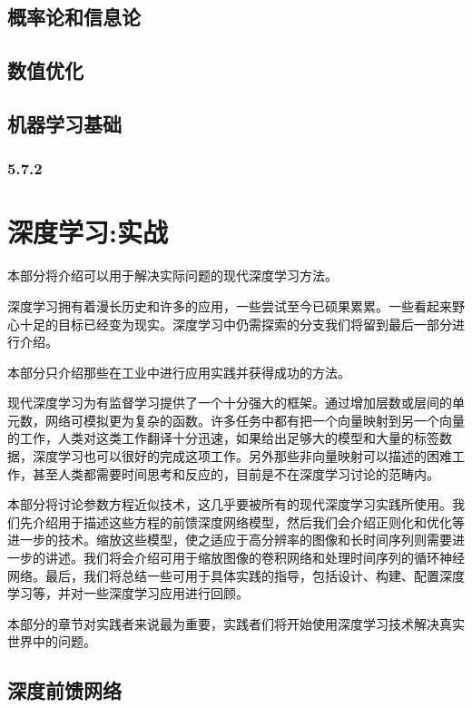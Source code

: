 \documentclass[a4paper,11pt]{book}
\begin{document}
\chapter{概率论和信息论}
\label{chap:3}

\chapter{数值优化}
\label{chap:4}

\chapter{机器学习基础}
\label{chap:5}

\section{5.7.2}
\label{sec:5.7.2}

\part{深度学习:实战}
\label{part:2}

本部分将介绍可以用于解决实际问题的现代深度学习方法。


深度学习拥有着漫长历史和许多的应用，一些尝试至今已硕果累累。一些看起来野心十足的目标已经变为现实。深度学习中仍需探索的分支我们将留到最后一部分进行介绍。


本部分只介绍那些在工业中进行应用实践并获得成功的方法。


现代深度学习为有监督学习提供了一个十分强大的框架。通过增加层数或层间的单元数，网络可模拟更为复杂的函数。许多任务中都有把一个向量映射到另一个向量的工作，人类对这类工作翻译十分迅速，如果给出足够大的模型和大量的标签数据，深度学习也可以很好的完成这项工作。另外那些非向量映射可以描述的困难工作，甚至人类都需要时间思考和反应的，目前是不在深度学习讨论的范畴内。


本部分将讨论参数方程近似技术，这几乎要被所有的现代深度学习实践所使用。我们先介绍用于描述这些方程的前馈深度网络模型，然后我们会介绍正则化和优化等进一步的技术。缩放这些模型，使之适应于高分辨率的图像和长时间序列则需要进一步的讲述。我们将会介绍可用于缩放图像的卷积网络和处理时间序列的循环神经网络。最后，我们将总结一些可用于具体实践的指导，包括设计、构建、配置深度学习等，并对一些深度学习应用进行回顾。


本部分的章节对实践者来说最为重要，实践者们将开始使用深度学习技术解决真实世界中的问题。

\chapter{深度前馈网络}
\label{chap:6}
\end{document}
